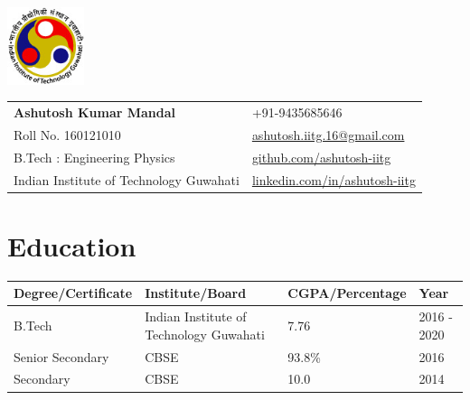 \documentclass[a4paper,11pt]{article}
\makeatletter
\newcommand{\resumeSubheading}[4]{
  \vspace{-1pt}\item
    \begin{tabular*}{0.97\textwidth}[t]{l@{\extracolsep{\fill}}r}
      \textbf{#1} & #2 \\
      \textit{\small#3} & \textit{\small #4} \\
    \end{tabular*}\vspace{-5pt}
}
\newcommand{\resumeSubHeadingListStart}{\begin{itemize}[leftmargin=*]}
\newcommand{\resumeSubHeadingListEnd}{\end{itemize}}
\makeatother
\begin{document}
\parbox{2.35cm}{%

\includegraphics[width=2.25cm,clip]{iitg_logo.jpg}

}\hspace{.1cm}\parbox{\dimexpr\linewidth-2.5cm\relax}{
\begin{tabu}to\linewidth{X[-1,l] X[-1,r]}
  \textbf{\LARGE Ashutosh Kumar Mandal} & +91-9435685646\\
  {Roll No. 160121010} & \href{mailto:ashutosh.iitg.16@gmail.com}{ashutosh.iitg.16@gmail.com}\\
  {B.Tech : Engineering Physics} &  \href{https://github.com/ashutosh-iitg}{github.com/ashutosh-iitg}\\
  {Indian Institute of Technology Guwahati} & \href{https://www.linkedin.com/in/ashutosh-iitg/}{linkedin.com/in/ashutosh-iitg}
\end{tabu}
}




\section{Education}
\setlength{\tabcolsep}{5pt} %
\begin{tabu}to\linewidth{|X[-1,c]| X[-1,c]| X[-1,c]| X[-1,c]|}
  \hline
  \textbf{Degree/Certificate } & \textbf{Institute/Board} & \textbf{CGPA/Percentage} & \textbf{Year}\\
  \hline
  B.Tech & Indian Institute of Technology Guwahati & 7.76 & 2016 - 2020\\
  \hline
  Senior Secondary & CBSE & 93.8\% & 2016 \\
  \hline
  Secondary & CBSE & 10.0 & 2014\\
  \hline
\end{tabu}
\end{document}
